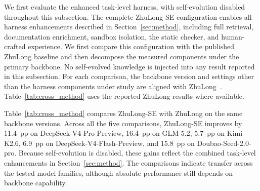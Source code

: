We first evaluate the enhanced task-level harness, with self-evolution disabled throughout this subsection. The complete ZhuLong-SE configuration enables all harness enhancements described in Section~\ref{sec:method}, including full retrieval, documentation enrichment, sandbox isolation, the static checker, and human-crafted experience. We first compare this configuration with the published ZhuLong baseline and then decompose the measured components under the primary backbone. No self-evolved knowledge is injected into any result reported in this subsection. For each comparison, the backbone version and settings other than the harness components under study are aligned with ZhuLong~\cite{liu2026zhulong}. Table~\ref{tab:cross_method} uses the reported ZhuLong results where available.

Table~\ref{tab:cross_method} compares ZhuLong-SE with ZhuLong on the same backbone versions. Across all the five comparisons, ZhuLong-SE improves by 11.4~pp on DeepSeek-V4-Pro-Preview, 16.4~pp on GLM-5.2, 5.7~pp on Kimi-K2.6, 6.9~pp on DeepSeek-V4-Flash-Preview, and 15.8~pp on Doubao-Seed-2.0-pro. Because self-evolution is disabled, these gains reflect the combined task-level enhancements in Section~\ref{sec:method}. The comparisons indicate transfer across the tested model families, although absolute performance still depends on backbone capability.

